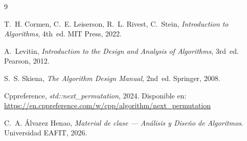 \documentclass[12pt, a4paper]{article}
\begin{document}
\begin{thebibliography}{9}

T.~H. Cormen, C.~E. Leiserson, R.~L. Rivest, C.~Stein,
\textit{Introduction to Algorithms}, 4th~ed. MIT Press, 2022.

A.~Levitin,
\textit{Introduction to the Design and Analysis of Algorithms}, 3rd~ed.
Pearson, 2012.

S.~S. Skiena,
\textit{The Algorithm Design Manual}, 2nd~ed. Springer, 2008.

Cppreference, \textit{std::next\_permutation}, 2024.
Disponible en: \url{https://en.cppreference.com/w/cpp/algorithm/next_permutation}

C.~A. Álvarez Henao,
\textit{Material de clase --- Análisis y Diseño de Algoritmos}.
Universidad EAFIT, 2026.

\end{thebibliography}
\end{document}
